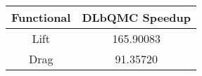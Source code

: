 \begin{tabular}{|c|c|}
\hline
Functional&DLbQMC Speedup\\ 
\hline

Lift & 165.90083\\ 
\hline
Drag & 91.35720\\ 
\hline
\end{tabular}

